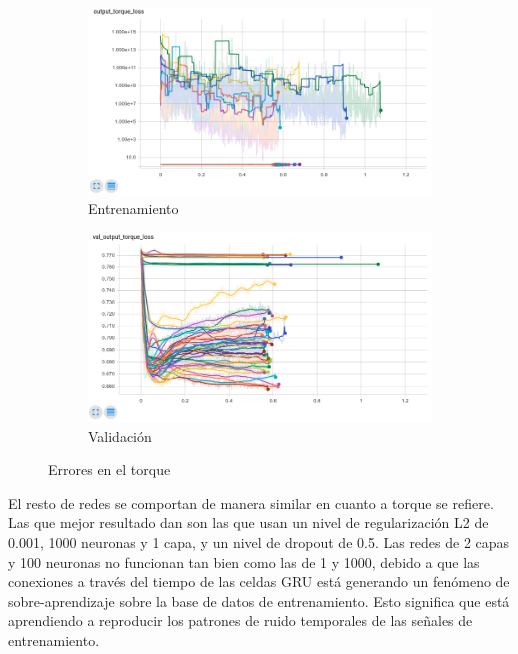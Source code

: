 \begin{figure}[thb]
	\begin{subfigure}[b]{0.9\textwidth}
		\centering
		\includegraphics[width=\linewidth]{imagenes/resultados/torque_loss_all.png}
		\caption{Entrenamiento}
		\label{fig:resultados/torque_loss_all}
	\end{subfigure}
	\begin{subfigure}[b]{0.9\textwidth}
		\centering
		\includegraphics[width=\linewidth]{imagenes/resultados/val_torque_loss_all.png}
		\caption{Validación}
		\label{fig:resultados/val_torque_loss_all}
	\end{subfigure}
	\caption{Errores en el torque}
	\label{fig:resultados/torque_all}
\end{figure}

El resto de redes se comportan de manera similar en cuanto a torque se refiere. Las que mejor resultado dan son las que usan un nivel de regularización L2 de 0.001, 1000 neuronas y 1 capa, y un nivel de dropout de 0.5. Las redes de 2 capas y 100 neuronas no funcionan tan bien como las de 1 y 1000, debido a que las conexiones a través del tiempo de las celdas GRU está generando un fenómeno de sobre-aprendizaje sobre la base de datos de entrenamiento. Esto significa que está aprendiendo a reproducir los patrones de ruido temporales de las señales de entrenamiento.

